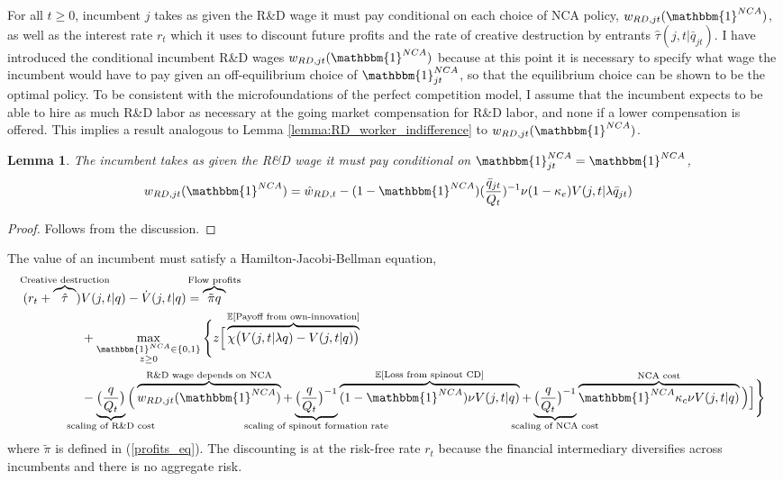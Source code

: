 \documentclass[11pt,english]{article}
\newtheorem{lemma}{Lemma}
\begin{document}
For all $t \ge 0$, incumbent $j$ takes as given the R\&D wage it must pay conditional on each choice of NCA policy, $w_{RD,jt}(\mathbbm{1}^{NCA})$, as well as the interest rate $r_t$ which it uses to discount future profits and the rate of creative destruction by entrants $\hat{\tau}(j,t|\bar{q}_{jt})$. I have introduced the conditional incumbent R\&D wages $w_{RD,jt}(\mathbbm{1}^{NCA})$ because at this point it is necessary to specify what wage the incumbent would have to pay given an off-equilibrium choice of $\mathbbm{1}^{NCA}_{jt}$, so that the equilibrium choice can be shown to be the optimal policy. To be consistent with the microfoundations of the perfect competition model, I assume that the incumbent expects to be able to hire as much R\&D labor as necessary at the going market compensation for R\&D labor, and none if a lower compensation is offered. This implies a result analogous to Lemma \ref{lemma:RD_worker_indifference} to $w_{RD,jt}(\mathbbm{1}^{NCA})$.

\begin{lemma}\label{lemma:RD_worker_indifference1}
	The incumbent takes as given the R\&D wage it must pay conditional on $\mathbbm{1}^{NCA}_{jt} = \mathbbm{1}^{NCA}$,
	\begin{align*}
		w_{RD,jt}(\mathbbm{1}^{NCA}) &= \hat{w}_{RD,t} - (1-\mathbbm{1}^{NCA}) (\frac{\bar{q}_{jt}}{Q_t})^{-1} \nu (1-\kappa_e) V(j,t|\lambda \bar{q}_{jt})
	\end{align*}
\end{lemma}

\begin{proof}
	Follows from the discussion.
\end{proof}

The value of an incumbent must satisfy a Hamilton-Jacobi-Bellman equation,
\begin{align}
(r_t + \overbrace{\hat{\tau}}^{\mathclap{\text{Creative destruction}}}) &V(j,t |q) - \dot{V}(j,t|q) = \overbrace{\tilde{\pi} q }^{\mathclap{\text{Flow profits}}}\nonumber \\_{}
&+ \max_{\substack{\mathbbm{1}^{NCA} \in \{0,1\} \\ z \ge 0}} \Bigg\{ z \Big[  \overbrace{\chi \big( V(j,t|\lambda q) - V(j,t|q)\big)}^{\mathclap{\mathbb{E}[\text{Payoff from own-innovation}]}}  \nonumber \\
&- \underbrace{\big(\frac{q}{Q_t}\big)}_{\mathclap{\text{scaling of R\&D cost}}} \Big( \overbrace{w_{RD,jt}(\mathbbm{1}^{NCA})}^{\mathclap{\text{R\&D wage depends on NCA}}} + \underbrace{\big(\frac{q}{Q_t}\big)^{-1}}_{\mathclap{\text{scaling of spinout formation rate}}} \overbrace{(1-\mathbbm{1}^{NCA}) \nu V(j,t|q)}^{\mathclap{\mathbb{E}[\text{Loss from spinout CD}]}} + \underbrace{\big(\frac{q}{Q_t}\big)^{-1}}_{\mathclap{\text{scaling of NCA cost}}}  \overbrace{\mathbbm{1}^{NCA} \kappa_c \nu V(j,t|q) }^{\mathclap{\text{NCA cost}}}\Big)  \Big] \Bigg\} \label{eq:hjb_incumbent_0}
\end{align}
where $\tilde{\pi}$ is defined in (\ref{profits_eq}). The discounting is at the risk-free rate $r_t$ because the financial intermediary diversifies across incumbents and there is no aggregate risk.
\end{document}
